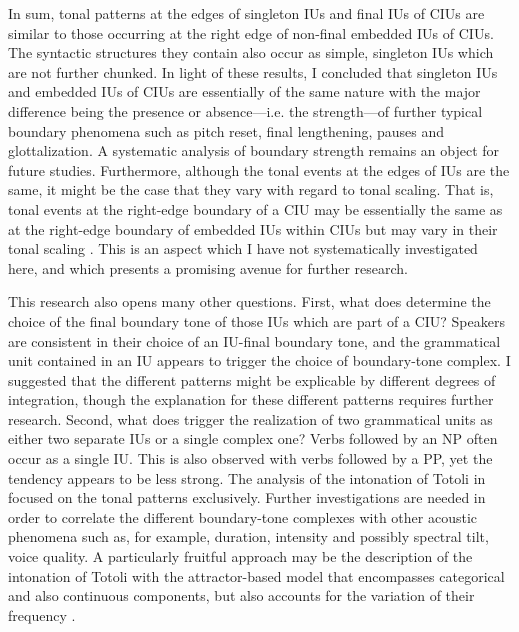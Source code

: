 

In sum, tonal patterns at the edges of singleton IUs and final IUs of CIUs are similar to those occurring at the right edge of non-final embedded IUs of CIUs. The syntactic structures they contain also occur as simple, singleton IUs which are not further chunked. In light of these results, I concluded that singleton IUs and embedded IUs of CIUs  are essentially of the same nature with the major difference being the presence or absence---i.e. the strength---of further typical boundary phenomena such as pitch reset, final lengthening, pauses and glottalization. A systematic analysis of boundary strength remains an object for future studies. Furthermore,  although the tonal events at the edges of IUs are the same, it might be the case that they vary with regard to tonal scaling. That is, tonal events at the right-edge boundary of a CIU may be essentially the same as at the right-edge boundary of embedded IUs within CIUs but  may vary in their tonal scaling \citep{Riad2018}. This is an aspect which I have not systematically investigated here, and which presents a promising avenue for further research.





This research also opens many other  questions. First, what does determine the choice of the final boundary tone of those IUs which are part of a CIU? Speakers are consistent in their choice of an IU-final boundary tone, and the grammatical unit contained in an IU appears to trigger the choice of boundary-tone complex. I suggested that the different patterns might be explicable by different degrees of integration, though the explanation for these different patterns requires further research. Second, what does trigger the realization of two grammatical units as either two separate IUs or a single complex one? Verbs followed by an NP often occur as a single IU. This is also observed with verbs followed by a PP, yet the tendency appears to be less strong. 
The analysis of the intonation of Totoli in   focused on the tonal patterns exclusively. Further investigations are needed in order to correlate the different boundary-tone complexes with other acoustic phenomena such as, for example, duration, intensity and possibly spectral tilt, voice quality. A particularly fruitful approach may be the description of the intonation of Totoli with the attractor-based model that encompasses  categorical and also continuous components, but also  accounts for the variation of their frequency \citep{journalpone0216859, Roessig2021}. 

